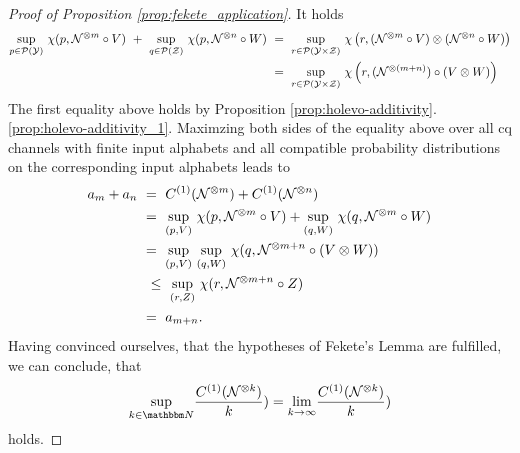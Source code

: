 \begin{proof}[Proof of Proposition \ref{prop:fekete_application}]
	It holds 
	\begin{align*}
	\underset{p \in \cP(\cY)}{\sup} \ \chi(p, \cN^{\otimes m}\circ V) \ + \ \underset{q \in \cP(\cZ)}{\sup} \ \chi(p, \cN^{\otimes n} \circ W) 
	\ & = \ \underset{r \in \cP(\cY \times \cZ)}{\sup} \ \chi\left(r, (\cN^{\otimes m} \circ V)\otimes (\cN^{\otimes n} \circ W)\right) \\
	\ & = \ \underset{r \in \cP(\cY \times \cZ)}{\sup} \ \chi\left(r, (\cN^{\otimes (m+n)}) \circ (V\otimes  W)\right)
	\end{align*}
	The first equality above holds by Proposition \ref{prop:holevo-additivity}.\ref{prop:holevo-additivity_1}. Maximzing both sides of the equality above over all cq channels with finite input alphabets and all compatible probability distributions on the corresponding input alphabets leads to 
	\begin{align*}
	a_m + a_n 
	\ & = \ C^{(1)}(\cN^{\otimes m}) + C^{(1)}(\cN^{\otimes n}) \\
	\ & = \ \underset{(p,V)}{\sup} \ \chi(p, \cN^{\otimes m}\circ V) + \underset{(q,W)}{\sup} \ \chi(q, \cN^{\otimes m} \circ W ) \\
	\ & = \ \underset{(p,V)}{\sup} \ \underset{(q,W)}{\sup} \ \chi(q, \cN^{\otimes m + n} \circ (V \otimes W)) \\
	\ & \ \leq \ \underset{(r,Z)}{\sup} \ \chi(r, \cN^{\otimes m + n} \circ Z) \\ 
	\ & = \ a_{m + n}.
	\end{align*}
	Having convinced ourselves, that the hypotheses of Fekete's Lemma are fulfilled, we can conclude, that 
	\begin{align}
	\underset{k \in \bbmN}{\sup} \frac{C^{(1)}(\cN^{\otimes k})}{k} ) =  \underset{k \rightarrow \infty}{\lim} \frac{C^{(1)}(\cN^{\otimes k})}{k} )
	\end{align}
	holds. 
     \end{proof}
